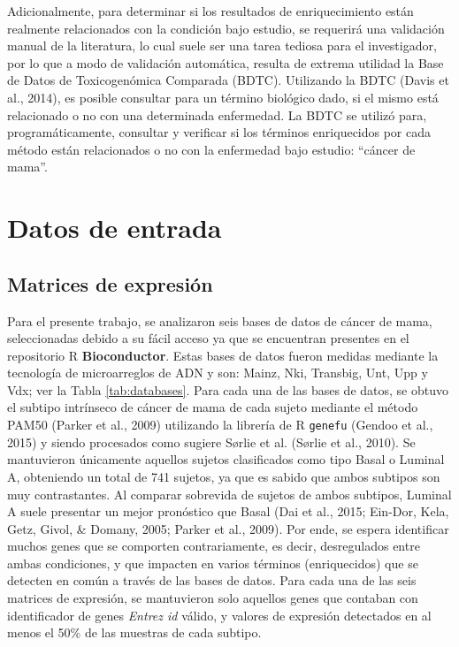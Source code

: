 \documentclass[12pt,twoside]{reedthesis}
\begin{document}
Adicionalmente, para determinar si los resultados de enriquecimiento están realmente relacionados con la condición bajo estudio, se requerirá una validación manual de la literatura, lo cual suele ser una tarea tediosa para el investigador, por lo que a modo de validación automática, resulta de extrema utilidad la Base de Datos de Toxicogenómica Comparada (BDTC). Utilizando la BDTC (Davis et al., 2014), es posible consultar para un término biológico dado, si el mismo está relacionado o no con una determinada enfermedad. La BDTC se utilizó para, programáticamente, consultar y verificar si los términos enriquecidos por cada método están relacionados o no con la enfermedad bajo estudio: ``cáncer de mama''.

\hypertarget{datos-de-entrada}{%
\section{Datos de entrada}\label{datos-de-entrada}}

\hypertarget{matrices-de-expresion}{%
\subsection{Matrices de expresión}\label{matrices-de-expresion}}

Para el presente trabajo, se analizaron seis bases de datos de cáncer de mama, seleccionadas debido a su fácil acceso ya que se encuentran presentes en el repositorio R \textbf{Bioconductor}. Estas bases de datos fueron medidas mediante la tecnología de microarreglos de ADN y son: Mainz, Nki, Transbig, Unt, Upp y Vdx; ver la Tabla \ref{tab:databases}. Para cada una de las bases de datos, se obtuvo el subtipo intrínseco de cáncer de mama de cada sujeto mediante el método PAM50 (Parker et al., 2009) utilizando la librería de R \texttt{genefu} (Gendoo et al., 2015) y siendo procesados como sugiere Sørlie et al. (Sørlie et al., 2010). Se mantuvieron únicamente aquellos sujetos clasificados como tipo Basal o Luminal A, obteniendo un total de 741 sujetos, ya que es sabido que ambos subtipos son muy contrastantes. Al comparar sobrevida de sujetos de ambos subtipos, Luminal A suele presentar un mejor pronóstico que Basal (Dai et al., 2015; Ein-Dor, Kela, Getz, Givol, \& Domany, 2005; Parker et al., 2009). Por ende, se espera identificar muchos genes que se comporten contrariamente, es decir, desregulados entre ambas condiciones, y que impacten en varios términos (enriquecidos) que se detecten en común a través de las bases de datos. Para cada una de las seis matrices de expresión, se mantuvieron solo aquellos genes que contaban con identificador de genes \emph{Entrez id} válido, y valores de expresión detectados en al menos el 50\% de las muestras de cada subtipo.
\end{document}
